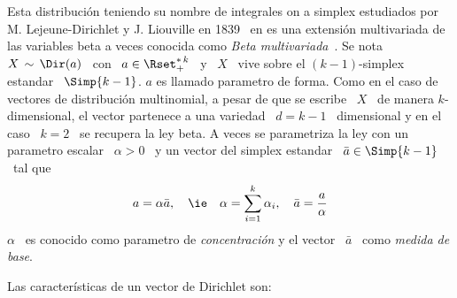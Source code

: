 \label{Sssec:MP:Dirichlet}

Esta distribuci\'on teniendo su nombre de integrales on a simplex estudiados por
M. Lejeune-Dirichlet y J. Liouville  en 1839~\cite{GupRic01, Dir39, Lio39} en es
una extensi\'on  multivariada de las variables  beta a veces  conocida como {\em
  Beta multivariada}~\cite{OlkRub64}. Se  nota \ $X \, \sim \,  \Dir(a)$ \ con \
$a \in \Rset_+^{*  \, k}$ \ y \  $X$ \ vive sobre el  $(k-1)$-simplex estandar \
$\Simp{k-1}$.  $a$ es  llamado parametro de forma. Como en  el caso de vectores
de  distribuci\'on multinomial, a  pesar de  que se  escribe \  $X$ \  de manera
$k$-dimensional, el vector partenece a una  variedad \ $d = k-1$ \ dimensional y
en el caso  \ $k = 2$ \ se  recupera la ley beta. A veces  se parametriza la ley
con un  parametro escalar \ $\alpha  > 0$ \ y  un vector del  simplex estandar \
$\bar{a} \in \Simp{k-1}$ \ tal que
%
\[
a = \alpha \bar{a}, \quad \mbox{\ie} \quad \alpha = \sum_{i=1}^k \alpha_i, \quad
\bar{a} = \frac{a}{\alpha}
\]
%
$\alpha$ \  es conocido como  parametro de {\em  concentraci\'on} y el  vector \
$\bar{a}$ \ como {\em medida de base}.

Las caracter\'isticas de un vector de Dirichlet son:

